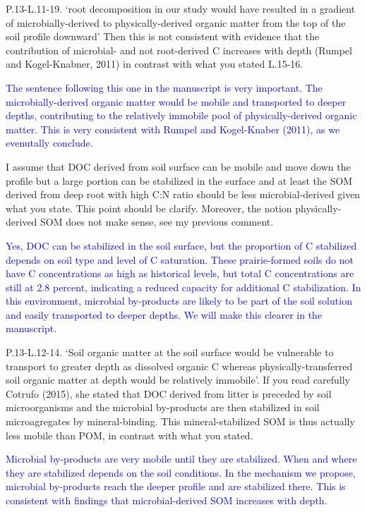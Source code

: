 \documentclass[]{article}
\begin{document}
P.13-L.11-19. `root decomposition in our study would have resulted in a
gradient of microbially-derived to physically-derived organic matter
from the top of the soil profile downward' Then this is not consistent
with evidence that the contribution of microbial- and not root-derived C
increases with depth (Rumpel and Kogel-Knabner, 2011) in contrast with
what you stated L.15-16.

\textcolor{blue}{The sentence following this one in the manuscript is very important. The microbially-derived organic matter would be mobile and transported to deeper depths, contributing to the relatively immobile pool of physically-derived organic matter. This is very consistent with Rumpel and Kogel-Knaber (2011), as we evenutally conclude.}

I assume that DOC derived from soil surface can be mobile and move down
the profile but a large portion can be stabilized in the surface and at
least the SOM derived from deep root with high C:N ratio should be less
microbial-derived given what you state. This point should be clarify.
Moreover, the notion physically-derived SOM does not make sense, see my
previous comment.

\textcolor{blue}{Yes, DOC can be stabilized in the soil surface, but the proportion of C stabilized depends on soil type and level of C saturation. These prairie-formed soils do not have C concentrations as high as historical levels, but total C concentrations are still at 2.8 percent, indicating a reduced capacity for additional C stabilization. In this environment, microbial by-products are likely to be part of the soil solution and easily transported to deeper depths. We will make this clearer in the manuscript.}

P.13-L.12-14. `Soil organic matter at the soil surface would be
vulnerable to transport to greater depth as dissolved organic C whereas
physically-transferred soil organic matter at depth would be relatively
immobile'. If you read carefully Cotrufo (2015), she stated that DOC
derived from litter is preceded by soil microorganisms and the microbial
by-products are then stabilized in soil microagregates by
mineral-binding. This mineral-stabilized SOM is thus actually less
mobile than POM, in contrast with what you stated.

\textcolor{blue}{Microbial by-products are very mobile until they are stabilized. When and where they are stabilized depends on the soil conditions. In the mechanism we propose, microbial by-products reach the deeper profile and are stabilized there. This is consistent with findings that microbial-derived SOM increases with depth.}
\end{document}
